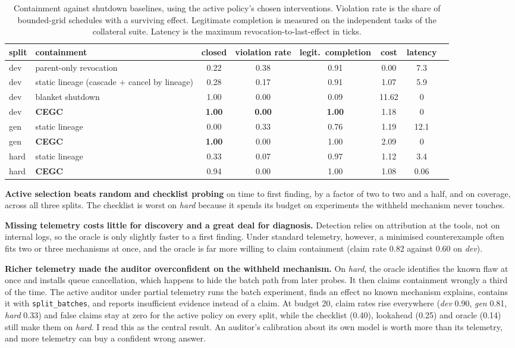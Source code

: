 \documentclass[10pt]{article}
\begin{document}
\begin{table}[h]\footnotesize\centering
\caption{Containment against shutdown baselines, using the active policy's chosen interventions. Violation rate is the share of bounded-grid schedules with a surviving effect. Legitimate completion is measured on the independent tasks of the collateral suite. Latency is the maximum revocation-to-last-effect in ticks.}
\begin{tabular}{@{}llcccccc@{}}\toprule
split & containment & closed & violation rate & legit.\ completion & cost & latency\\\midrule
dev & parent-only revocation & 0.22 & 0.38 & 0.91 & 0.00 & 7.3\\
dev & static lineage (cascade + cancel by lineage) & 0.28 & 0.17 & 0.91 & 1.07 & 5.9\\
dev & blanket shutdown & 1.00 & 0.00 & 0.09 & 11.62 & 0\\
dev & \textbf{CEGC} & \textbf{1.00} & \textbf{0.00} & \textbf{1.00} & 1.18 & 0\\\midrule
gen & static lineage & 0.00 & 0.33 & 0.76 & 1.19 & 12.1\\
gen & \textbf{CEGC} & \textbf{1.00} & 0.00 & 1.00 & 2.09 & 0\\\midrule
hard & static lineage & 0.33 & 0.07 & 0.97 & 1.12 & 3.4\\
hard & \textbf{CEGC} & 0.94 & 0.00 & 1.00 & 1.08 & 0.06\\
\bottomrule\end{tabular}
\end{table}

\textbf{Active selection beats random and checklist probing} on time to first finding, by a factor of two to two and a half, and on coverage, across all three splits. The checklist is worst on \emph{hard} because it spends its budget on experiments the withheld mechanism never touches.

\textbf{Missing telemetry costs little for discovery and a great deal for diagnosis.} Detection relies on attribution at the tools, not on internal logs, so the oracle is only slightly faster to a first finding. Under standard telemetry, however, a minimised counterexample often fits two or three mechanisms at once, and the oracle is far more willing to claim containment (claim rate 0.82 against 0.60 on \emph{dev}).

\textbf{Richer telemetry made the auditor overconfident on the withheld mechanism.} On \emph{hard}, the oracle identifies the known flaw at once and installs queue cancellation, which happens to hide the batch path from later probes. It then claims containment wrongly a third of the time. The active auditor under partial telemetry runs the batch experiment, finds an effect no known mechanism explains, contains it with \texttt{split\_batches}, and reports insufficient evidence instead of a claim. At budget 20, claim rates rise everywhere (\emph{dev} 0.90, \emph{gen} 0.81, \emph{hard} 0.33) and false claims stay at zero for the active policy on every split, while the checklist (0.40), lookahead (0.25) and oracle (0.14) still make them on \emph{hard}. I read this as the central result. An auditor's calibration about its own model is worth more than its telemetry, and more telemetry can buy a confident wrong answer.
\end{document}
